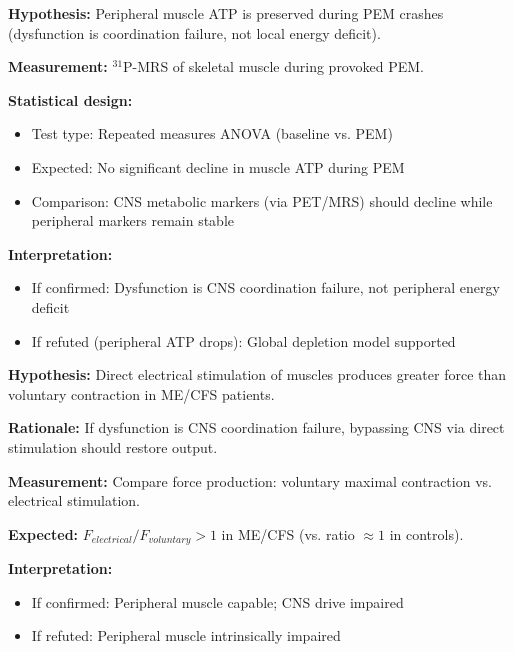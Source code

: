 \begin{prediction}
\label{pred:peripheral-atp}
\textbf{Hypothesis:} Peripheral muscle ATP is preserved during PEM crashes (dysfunction is coordination failure, not local energy deficit).

\textbf{Measurement:} $^{31}$P-MRS of skeletal muscle during provoked PEM.

\textbf{Statistical design:}
\begin{itemize}
    \item Test type: Repeated measures ANOVA (baseline vs. PEM)
    \item Expected: No significant decline in muscle ATP during PEM
    \item Comparison: CNS metabolic markers (via PET/MRS) should decline while peripheral markers remain stable
\end{itemize}

\textbf{Interpretation:}
\begin{itemize}
    \item If confirmed: Dysfunction is CNS coordination failure, not peripheral energy deficit
    \item If refuted (peripheral ATP drops): Global depletion model supported
\end{itemize}
\end{prediction}

\begin{prediction}
\label{pred:direct-stim}
\textbf{Hypothesis:} Direct electrical stimulation of muscles produces greater force than voluntary contraction in ME/CFS patients.

\textbf{Rationale:} If dysfunction is CNS coordination failure, bypassing CNS via direct stimulation should restore output.

\textbf{Measurement:} Compare force production: voluntary maximal contraction vs. electrical stimulation.

\textbf{Expected:} $F_{electrical} / F_{voluntary} > 1$ in ME/CFS (vs. ratio $\approx 1$ in controls).

\textbf{Interpretation:}
\begin{itemize}
    \item If confirmed: Peripheral muscle capable; CNS drive impaired
    \item If refuted: Peripheral muscle intrinsically impaired
\end{itemize}
\end{prediction}

